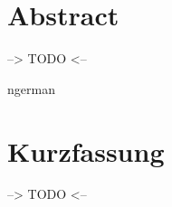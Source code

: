 \documentclass[a4paper, 11pt]{article}
\begin{document}


\newpage

\section*{Abstract}

--> TODO <--

\clearpage
\begin{otherlanguage}
    {ngerman}
    \section*{Kurzfassung}
    --> TODO <--
\end{otherlanguage}

\clearpage

\tableofcontents


\clearpage

\clearpage

\clearpage

\clearpage

\clearpage

\clearpage

\clearpage


\end{document}

